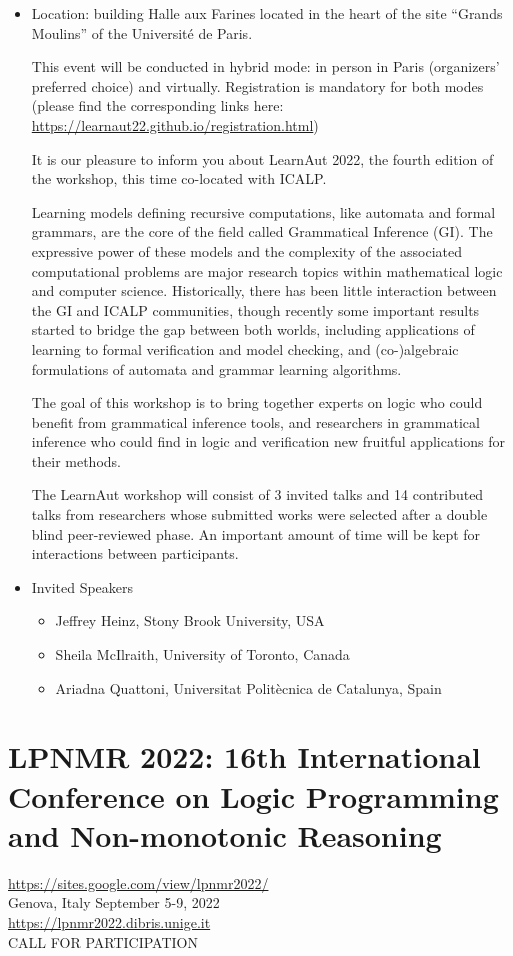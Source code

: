 \documentclass[prodmode,acmtecs]{acmsmall} %
\begin{document}
\begin{itemize}\item  Location: building Halle aux Farines located in the heart of the site “Grands Moulins” of the Université de Paris.  
 
  This event will be conducted in hybrid mode: in person in Paris (organizers' preferred choice) and virtually. Registration is mandatory for both modes (please find the corresponding links here: \href{https://learnaut22.github.io/registration.html}{https://learnaut22.github.io/registration.html}) 
 
  It is our pleasure to inform you about LearnAut 2022, the fourth edition of the workshop, this time co-located with ICALP.  
 
  Learning models defining recursive computations, like automata and formal grammars, are the core of the field called Grammatical Inference (GI). The expressive power of these models and the complexity of the associated computational problems are major research topics within mathematical logic and computer science. Historically, there has been little interaction between the GI and ICALP communities, though recently some important results started to bridge the gap between both worlds, including applications of learning to formal verification and model checking, and (co-)algebraic formulations of automata and grammar learning algorithms. 
 
  The goal of this workshop is to bring together experts on logic who could benefit from grammatical inference tools, and researchers in grammatical inference who could find in logic and verification new fruitful applications for their methods. 
 
  The LearnAut workshop will consist of 3 invited talks and 14 contributed talks from researchers whose submitted works were selected after a double blind peer-reviewed phase. An important amount of time will be kept for interactions between participants. 
 
\item  Invited Speakers 
 
\begin{itemize}\item  Jeffrey Heinz, Stony Brook University, USA
\item  Sheila McIlraith, University of Toronto, Canada
\item  Ariadna Quattoni, Universitat Politècnica de Catalunya, Spain
\end{itemize} 
\end{itemize}\section{LPNMR 2022: 16th International Conference on Logic Programming and Non-monotonic Reasoning}\label{LPNMR2022}  \href{https://sites.google.com/view/lpnmr2022/}{https://sites.google.com/view/lpnmr2022/}\\ 
  Genova, Italy September 5-9, 2022\\ 
  \href{https://lpnmr2022.dibris.unige.it}{https://lpnmr2022.dibris.unige.it}\\ 
CALL FOR PARTICIPATION 
\end{document}
